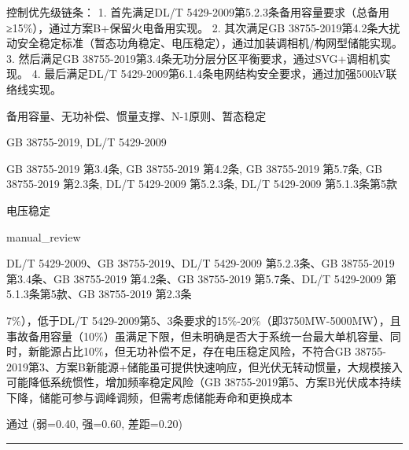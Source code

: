 \documentclass[11pt,a4paper]{ctexart}
\begin{document}
\begin{description}[leftmargin=1.5em,style=nextline,font=\normalfont]
控制优先级链条：
1. 首先满足DL/T 5429-2009第5.2.3条备用容量要求（总备用≥15\%），通过方案B+保留火电备用实现。
2. 其次满足GB 38755-2019第4.2条大扰动安全稳定标准（暂态功角稳定、电压稳定），通过加装调相机/构网型储能实现。
3. 然后满足GB 38755-2019第3.4条无功分层分区平衡要求，通过SVG+调相机实现。
4. 最后满足DL/T 5429-2009第6.1.4条电网结构安全要求，通过加强500kV联络线实现。
  \item[KW:] 备用容量、无功补偿、惯量支撑、N-1原则、暂态稳定
  \item[标准:] GB 38755-2019, DL/T 5429-2009
  \item[条款溯源:] GB 38755-2019 第3.4条, GB 38755-2019 第4.2条, GB 38755-2019 第5.7条, GB 38755-2019 第2.3条, DL/T 5429-2009 第5.2.3条, DL/T 5429-2009 第5.1.3条第5款
  \item[主题:] 电压稳定
  \item[评分方式:] manual\_review
  \item[Rubric条款:] DL/T 5429-2009、GB 38755-2019、DL/T 5429-2009 第5.2.3条、GB 38755-2019 第3.4条、GB 38755-2019 第4.2条、GB 38755-2019 第5.7条、DL/T 5429-2009 第5.1.3条第5款、GB 38755-2019 第2.3条
  \item[Rubric判据:] 7\%），低于DL/T 5429-2009第5、3条要求的15\%-20\%（即3750MW-5000MW），且事故备用容量（10\%）虽满足下限，但未明确是否大于系统一台最大单机容量、同时，新能源占比10\%，但无功补偿不足，存在电压稳定风险，不符合GB 38755-2019第3、方案B新能源+储能虽可提供快速响应，但光伏无转动惯量，大规模接入可能降低系统惯性，增加频率稳定风险（GB 38755-2019第5、方案B光伏成本持续下降，储能可参与调峰调频，但需考虑储能寿命和更换成本
  \item[LJ判定:] 通过 (弱=0.40, 强=0.60, 差距=0.20)
\end{description}
\vspace{4pt}
\hrule
\vspace{6pt}
\end{document}
